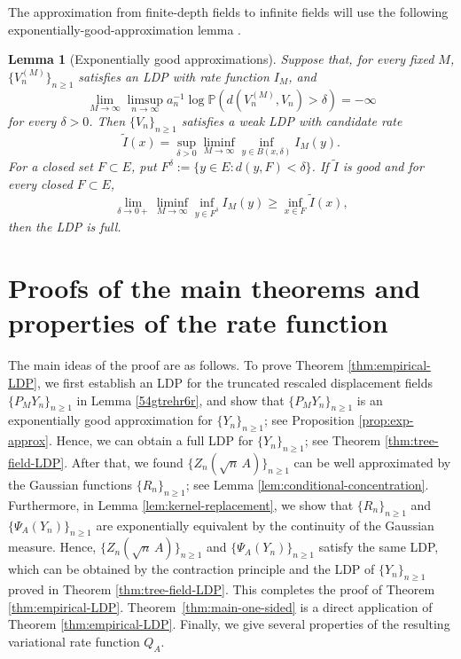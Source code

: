\documentclass[a4paper, 11pt]{article}
\newcommand{\1}{\mathbf 1}
\theoremstyle{plain}
\newtheorem{lemma}[theorem]{Lemma}
\begin{document}
The approximation from finite-depth fields to infinite fields will use the following
exponentially-good-approximation lemma
\cite[Theorem~4.2.16]{DemboZeitouni2010}.

\begin{lemma}[Exponentially good approximations]
\label{lem:good-approximation-DZ}
Suppose that, for every fixed \(M\), \(\{V_n^{(M)}\}_{n\geq1}\) satisfies an LDP with
rate function \(I_M\), and
\[
  \lim_{M\to\infty}\limsup_{n\to\infty}a_n^{-1}
  \log\mathbb{P}(d(V_n^{(M)},V_n)>\delta)=-\infty
\]
for every \(\delta>0\). Then \(\{V_n\}_{n\geq1}\) satisfies a weak LDP with candidate
rate
\[
  \widetilde I(x)
  =
  \sup_{\delta>0}\liminf_{M\to\infty}
  \inf_{y\in B(x,\delta)}I_M(y).
\]
For a closed set \(F\subset E\), put
\(F^\delta:=\{y\in E:d(y,F)<\delta\}\). If \(\widetilde I\) is good and
for every closed \(F\subset E\),
\[
  \lim_{\delta\to0+}\liminf_{M\to\infty}
  \inf_{y\in F^\delta}I_M(y)
  \geq \inf_{x\in F}\widetilde I(x),
\]
then the LDP is full.
\end{lemma}

\section{Proofs of the main theorems and properties of the rate function}
\label{sec:proofs}

The main ideas of the proof are as follows. To prove Theorem \ref{thm:empirical-LDP}, we first establish an LDP for the truncated
rescaled displacement fields $\{P_MY_n\}_{n\geq1}$ in Lemma \ref{54gtrehr6r}, and show that $\{P_MY_n\}_{n\geq1}$ is an
exponentially good approximation for $\{Y_n\}_{n\geq1}$; see Proposition \ref{prop:exp-approx}. Hence, we can obtain a full LDP for $\{Y_n\}_{n\geq1}$; see Theorem \ref{thm:tree-field-LDP}. After that, we found $\{Z_n(\sqrt n\,A)\}_{n\geq1}$ can be well approximated by the Gaussian functions $\{R_n
\}_{n\geq1}$; see Lemma \ref{lem:conditional-concentration}. Furthermore, in Lemma \ref{lem:kernel-replacement}, we show that \(\{R_n\}_{n\geq1}\) and \(\{\Psi_A(Y_n)\}_{n\geq1}\) are exponentially equivalent by the continuity of the Gaussian measure. Hence, $\{Z_n(\sqrt n\,A)\}_{n\geq1}$ and \(\{\Psi_A(Y_n)\}_{n\geq1}\) satisfy the same LDP, which can be obtained by the contraction principle and the LDP of $\{Y_n\}_{n\geq1}$ proved in Theorem \ref{thm:tree-field-LDP}. This completes the proof of Theorem \ref{thm:empirical-LDP}. Theorem~\ref{thm:main-one-sided} is a direct application of Theorem \ref{thm:empirical-LDP}. Finally, we give several properties of the resulting variational rate function $Q_A$.
\end{document}
